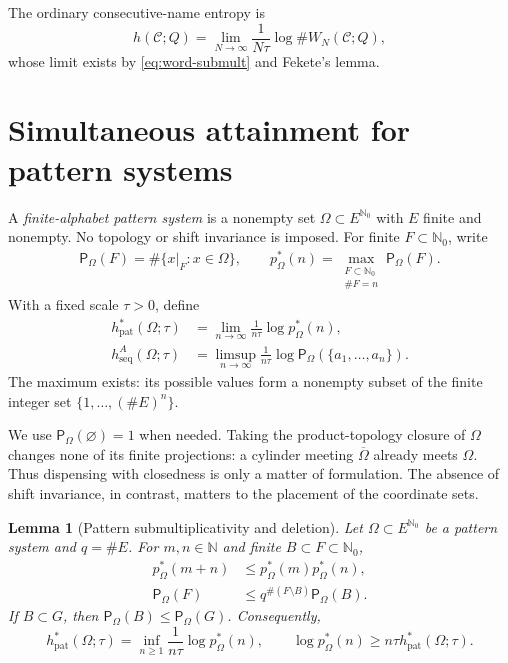 \documentclass[11pt,reqno]{amsart}
\numberwithin{equation}{section}
\newtheorem{lemma}[theorem]{Lemma}
\theoremstyle{definition}
\newcommand{\N}{\mathbb N}
\newcommand{\Nzero}{\mathbb N_0}
\newcommand{\C}{\mathcal C}
\newcommand{\Patt}{\mathsf P}
\newcommand{\hseq}{h_{\mathrm{seq}}}
\newcommand{\hpat}{h_{\mathrm{pat}}^{*}}
\begin{document}
The ordinary consecutive-name entropy is
\begin{equation}\label{eq:ordinary-partition-entropy}
 h(\C;Q)=\lim_{N\to\infty}\frac1{N\tau}\log\#W_N(\C;Q),
\end{equation}
whose limit exists by \eqref{eq:word-submult} and Fekete's lemma.

\section{Simultaneous attainment for pattern systems}\label{sec:comb}

A \emph{finite-alphabet pattern system} is a nonempty set
$\Omega\subset E^{\Nzero}$ with $E$ finite and nonempty.  No topology or
shift invariance is imposed.  For finite $F\subset\Nzero$, write
\begin{align*}
 \Patt_\Omega(F)=\#\{x|_F:x\in\Omega\},
 \qquad
 p_\Omega^*(n)=
 \max_{\substack{F\subset\Nzero\\\#F=n}}\Patt_\Omega(F).
\end{align*}
With a fixed scale $\tau>0$, define
\begin{align*}
 \hpat(\Omega;\tau)&=\lim_{n\to\infty}
       \frac1{n\tau}\log p_\Omega^*(n),\\
 \hseq^A(\Omega;\tau)&=\limsup_{n\to\infty}
       \frac1{n\tau}\log
       \Patt_\Omega(\{a_1,\ldots,a_n\}).
\end{align*}
The maximum exists: its possible values form a nonempty subset of the finite
integer set $\{1,\ldots,(\#E)^n\}$.

We use $\Patt_\Omega(\varnothing)=1$ when needed.
Taking the product-topology closure of $\Omega$ changes none of its
finite projections: a cylinder meeting $\overline\Omega$ already meets
$\Omega$. Thus dispensing with closedness is only a matter of
formulation. The absence of shift invariance, in contrast, matters to the
placement of the coordinate sets.

\begin{lemma}[Pattern submultiplicativity and deletion]\label{lem:pattern-submult}
Let $\Omega\subset E^{\Nzero}$ be a pattern system and $q=\#E$.
For $m,n\in\N$ and finite $B\subset F\subset\Nzero$,
\begin{align}
 p_\Omega^*(m+n)&\le p_\Omega^*(m)p_\Omega^*(n),
 \label{eq:pattern-submult}\\
 \Patt_\Omega(F)&\le q^{\#(F\setminus B)}\Patt_\Omega(B).
 \label{eq:deletion} 
\end{align}
If $B\subset G$, then $\Patt_\Omega(B)\le\Patt_\Omega(G)$.
Consequently,
\begin{equation}\label{eq:fekete-pstar}
 \hpat(\Omega;\tau)
 =\inf_{n\ge1}\frac1{n\tau}\log p_\Omega^*(n),
 \qquad
 \log p_\Omega^*(n)\ge n\tau\hpat(\Omega;\tau).
\end{equation}
\end{lemma}
\end{document}
